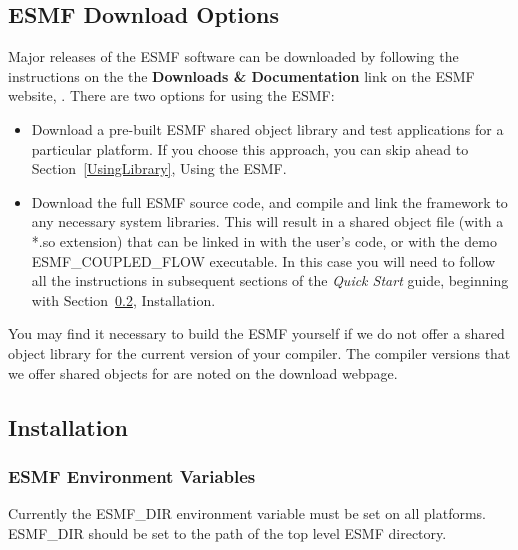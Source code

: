 
\subsection{ESMF Download Options}

Major releases of the ESMF software can be downloaded by following
the instructions on the 
the {\bf Downloads \& Documentation} link on the ESMF 
website, .  There are two options for using the ESMF:

\begin{itemize}
\item Download a pre-built ESMF shared object library and
test applications for a particular platform.  If you choose
this approach, you can skip ahead to Section~\ref{UsingLibrary},
Using the ESMF.  
\item Download the full ESMF source code, and compile and link
the framework to any necessary system libraries.  This will
result in a shared object file (with a *.so extension)
that can be linked in with the user's code, or with the demo
{ESMF\_COUPLED\_FLOW} executable.  In this case you will need
to follow all the instructions in subsequent sections of the 
{\it Quick Start} guide, beginning with Section~\ref{InstallProcedures},
Installation.
\end{itemize}

You may find it necessary to build the ESMF yourself
if we do not offer a shared object library for the current
version of your compiler.  The compiler versions that we offer
shared objects for are noted on the download webpage.

\subsection{Installation}
\label{InstallProcedures}



\subsubsection{ESMF Environment Variables}
\label{EnvironmentVariables}

Currently the ESMF\_DIR environment variable must be set on all
platforms.  ESMF\_DIR should be set to the path of the top
level ESMF directory.  

